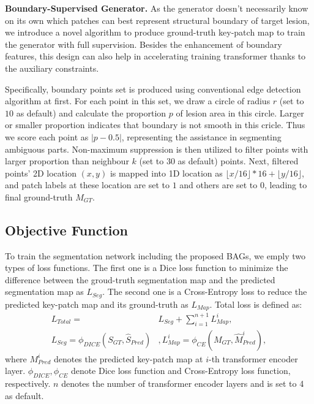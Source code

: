 \documentclass[runningheads]{paper478-llncs}
\begin{document}
\textbf{Boundary-Supervised Generator.} 
As the generator doesn't necessarily know on its own which patches can best represent structural boundary of target lesion, we introduce a novel algorithm to produce ground-truth key-patch map to train the generator with full supervision.
Besides the enhancement of boundary features, this design can also help in accelerating training transformer thanks to the auxiliary constraints.

Specifically, boundary points set is produced using conventional edge detection algorithm at first. 
For each point in this set, we draw a circle of radius $r$ (set to $10$ as default) and calculate the proportion $p$ of lesion area in this circle.
Larger or smaller proportion indicates that boundary is not smooth in this cricle.
Thus we score each point as $|p-0.5|$, representing the assistance in segmenting ambiguous parts.
Non-maximum suppression is then utilized to filter points with larger proportion than neighbour $k$ (set to $30$ as default) points.
Next, filtered points' 2D location $(x,y)$ is mapped into 1D location as $\lfloor x/16 \rfloor *16 + \lfloor y/16 \rfloor$, and patch labels at these location are set to $1$ and others are set to 0, leading to final ground-truth $M_{GT}$. 


\subsection{Objective Function}
\label{section_objective_function}
To train the segmentation network including the proposed BAGs, we emply two types of loss functions. The first one is a Dice loss function to minimize the difference between the groud-truth segmentation map and the predicted segmentation map as $L_{Seg}$. The second one is a Cross-Entropy loss to reduce the predicted key-patch map and its ground-truth as $L_{Map}$. Total loss is defined as:
\begin{equation}
    \begin{aligned}
        L_{Total} = &L_{Seg} + \sum_{i=1}^{n+1}L_{Map}^{i}, \\
        L_{Seg} = \phi_{DICE}(S_{GT},\hat{S}_{Pred})&,
        L_{Map}^i = \phi_{CE}(M_{GT},\hat{M}_{Pred}^i),
    \end{aligned}
\end{equation}
where $M_{Pred}^i$ denotes the predicted key-patch map at $i$-th transformer encoder layer. $\phi_{DICE},\phi_{CE}$ denote Dice loss function and Cross-Entropy loss function, respectively. $n$ denotes the number of transformer encoder layers and is set to 4 as default. 
\end{document}
